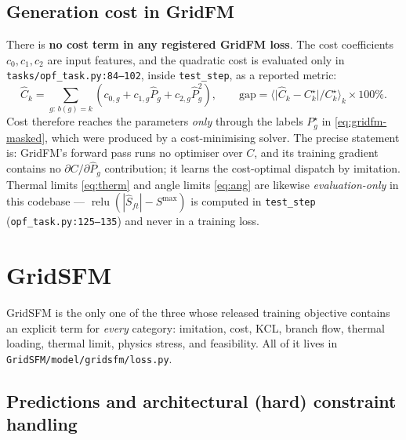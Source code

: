 \documentclass[11pt]{article}
\newcommand{\pred}[1]{\widehat{#1}}
\newcommand{\code}[1]{\texttt{\small #1}}
\newcommand{\relu}{\operatorname{relu}}
\begin{document}
\subsection{Generation cost in GridFM}

There is \textbf{no cost term in any registered GridFM loss}. The cost coefficients
$c_0,c_1,c_2$ are input features, and the quadratic cost is evaluated only in
\code{tasks/opf\_task.py:84--102}, inside \code{test\_step}, as a reported metric:
\begin{equation}
\pred{C}_k=\!\!\sum_{g:\,b(g)=k}\!\!\left(c_{0,g}+c_{1,g}\pred{P}_g+c_{2,g}\pred{P}_g^2\right),
\qquad
\mathrm{gap}=\Big\langle \big|\pred{C}_k-C^\star_k\big|/C^\star_k\Big\rangle_k\times 100\% .
\label{eq:gridfm-gap}
\end{equation}
Cost therefore reaches the parameters \emph{only} through the labels $P^\star_g$ in
\eqref{eq:gridfm-masked}, which were produced by a cost-minimising solver. The precise
statement is: GridFM's forward pass runs no optimiser over $C$, and its training gradient
contains no $\partial C/\partial\pred{P}_g$ contribution; it learns the cost-optimal
dispatch by imitation. Thermal limits \eqref{eq:therm} and angle limits \eqref{eq:ang} are
likewise \emph{evaluation-only} in this codebase --- $\relu(|\pred{S}_{ft}|-S^{\max})$ is
computed in \code{test\_step} (\code{opf\_task.py:125--135}) and never in a training loss.

\section{GridSFM}
\label{sec:gridsfm}

GridSFM is the only one of the three whose released training objective contains an explicit
term for \emph{every} category: imitation, cost, KCL, branch flow, thermal loading, thermal
limit, physics stress, and feasibility. All of it lives in
\code{GridSFM/model/gridsfm/loss.py}.

\subsection{Predictions and architectural (hard) constraint handling}
\end{document}
